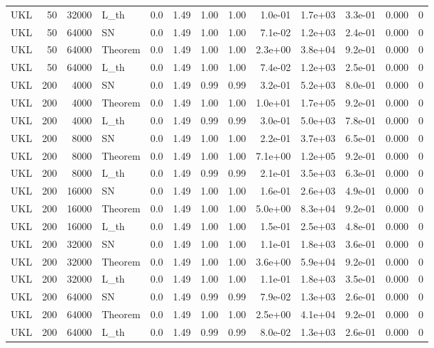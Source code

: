 \begin{tabular}{lrrlrrrrrrrrr}
UKL & 50 & 32000 & L\_th & 0.0 & 1.49 & 1.00 & 1.00 & 1.0e-01 & 1.7e+03 & 3.3e-01 & 0.000 & 0 \\
UKL & 50 & 64000 & SN & 0.0 & 1.49 & 1.00 & 1.00 & 7.1e-02 & 1.2e+03 & 2.4e-01 & 0.000 & 0 \\
UKL & 50 & 64000 & Theorem & 0.0 & 1.49 & 1.00 & 1.00 & 2.3e+00 & 3.8e+04 & 9.2e-01 & 0.000 & 0 \\
UKL & 50 & 64000 & L\_th & 0.0 & 1.49 & 1.00 & 1.00 & 7.4e-02 & 1.2e+03 & 2.5e-01 & 0.000 & 0 \\
UKL & 200 & 4000 & SN & 0.0 & 1.49 & 0.99 & 0.99 & 3.2e-01 & 5.2e+03 & 8.0e-01 & 0.000 & 0 \\
UKL & 200 & 4000 & Theorem & 0.0 & 1.49 & 1.00 & 1.00 & 1.0e+01 & 1.7e+05 & 9.2e-01 & 0.000 & 0 \\
UKL & 200 & 4000 & L\_th & 0.0 & 1.49 & 0.99 & 0.99 & 3.0e-01 & 5.0e+03 & 7.8e-01 & 0.000 & 0 \\
UKL & 200 & 8000 & SN & 0.0 & 1.49 & 1.00 & 1.00 & 2.2e-01 & 3.7e+03 & 6.5e-01 & 0.000 & 0 \\
UKL & 200 & 8000 & Theorem & 0.0 & 1.49 & 1.00 & 1.00 & 7.1e+00 & 1.2e+05 & 9.2e-01 & 0.000 & 0 \\
UKL & 200 & 8000 & L\_th & 0.0 & 1.49 & 0.99 & 0.99 & 2.1e-01 & 3.5e+03 & 6.3e-01 & 0.000 & 0 \\
UKL & 200 & 16000 & SN & 0.0 & 1.49 & 1.00 & 1.00 & 1.6e-01 & 2.6e+03 & 4.9e-01 & 0.000 & 0 \\
UKL & 200 & 16000 & Theorem & 0.0 & 1.49 & 1.00 & 1.00 & 5.0e+00 & 8.3e+04 & 9.2e-01 & 0.000 & 0 \\
UKL & 200 & 16000 & L\_th & 0.0 & 1.49 & 1.00 & 1.00 & 1.5e-01 & 2.5e+03 & 4.8e-01 & 0.000 & 0 \\
UKL & 200 & 32000 & SN & 0.0 & 1.49 & 1.00 & 1.00 & 1.1e-01 & 1.8e+03 & 3.6e-01 & 0.000 & 0 \\
UKL & 200 & 32000 & Theorem & 0.0 & 1.49 & 1.00 & 1.00 & 3.6e+00 & 5.9e+04 & 9.2e-01 & 0.000 & 0 \\
UKL & 200 & 32000 & L\_th & 0.0 & 1.49 & 1.00 & 1.00 & 1.1e-01 & 1.8e+03 & 3.5e-01 & 0.000 & 0 \\
UKL & 200 & 64000 & SN & 0.0 & 1.49 & 0.99 & 0.99 & 7.9e-02 & 1.3e+03 & 2.6e-01 & 0.000 & 0 \\
UKL & 200 & 64000 & Theorem & 0.0 & 1.49 & 1.00 & 1.00 & 2.5e+00 & 4.1e+04 & 9.2e-01 & 0.000 & 0 \\
UKL & 200 & 64000 & L\_th & 0.0 & 1.49 & 0.99 & 0.99 & 8.0e-02 & 1.3e+03 & 2.6e-01 & 0.000 & 0 \\

\end{tabular}
